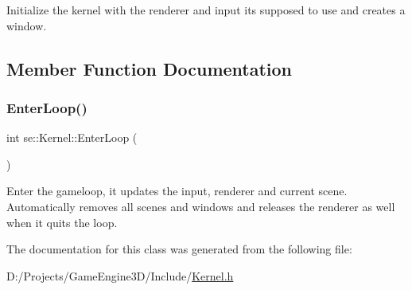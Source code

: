 Initialize the kernel with the renderer and input it\textquotesingle{}s supposed to use and creates a window. 

\subsection{Member Function Documentation}
\mbox{\label{classse_1_1_kernel_a1faeac6fce02ccd7ff76d94ad78e0754}} 
\subsubsection{\texorpdfstring{Enter\+Loop()}{EnterLoop()}}
{\footnotesize\ttfamily int se\+::\+Kernel\+::\+Enter\+Loop (\begin{DoxyParamCaption}{ }\end{DoxyParamCaption})}

Enter the gameloop, it updates the input, renderer and current scene. Automatically removes all scenes and windows and releases the renderer as well when it quits the loop. 

The documentation for this class was generated from the following file\+:\begin{DoxyCompactItemize}
\item 
D\+:/\+Projects/\+Game\+Engine3\+D/\+Include/\mbox{\hyperlink{_kernel_8h}{Kernel.\+h}}\end{DoxyCompactItemize}

